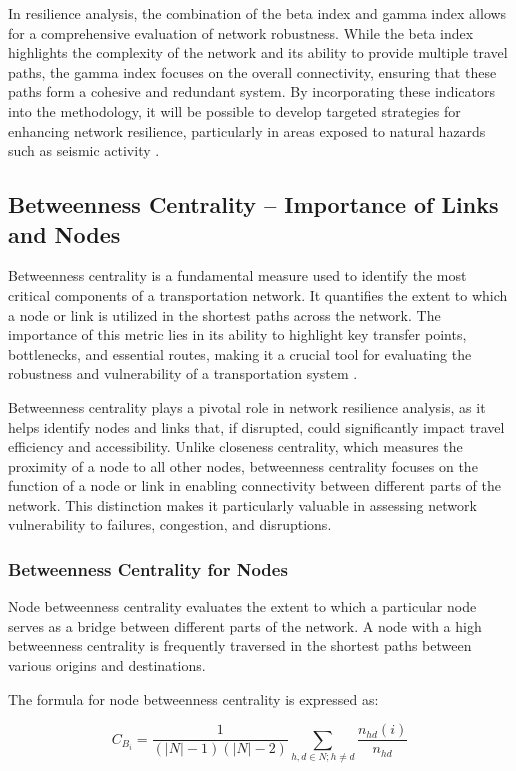 In resilience analysis, the combination of the beta index and gamma index allows for a comprehensive evaluation of network robustness. While the beta index highlights the complexity of the network and its ability to provide multiple travel paths, the gamma index focuses on the overall connectivity, ensuring that these paths form a cohesive and redundant system. By incorporating these indicators into the methodology, it will be possible to develop targeted strategies for enhancing network resilience, particularly in areas exposed to natural hazards such as seismic activity \cite{derrible2010, taylor2017}.

\subsection{Betweenness Centrality – Importance of Links and Nodes}
Betweenness centrality is a fundamental measure used to identify the most critical components of a transportation network. It quantifies the extent to which a node or link is utilized in the shortest paths across the network. The importance of this metric lies in its ability to highlight key transfer points, bottlenecks, and essential routes, making it a crucial tool for evaluating the robustness and vulnerability of a transportation system \cite{taylor2017}.

Betweenness centrality plays a pivotal role in network resilience analysis, as it helps identify nodes and links that, if disrupted, could significantly impact travel efficiency and accessibility. Unlike closeness centrality, which measures the proximity of a node to all other nodes, betweenness centrality focuses on the function of a node or link in enabling connectivity between different parts of the network. This distinction makes it particularly valuable in assessing network vulnerability to failures, congestion, and disruptions.
\subsubsection{Betweenness Centrality for Nodes}
Node betweenness centrality evaluates the extent to which a particular node serves as a bridge between different parts of the network. A node with a high betweenness centrality is frequently traversed in the shortest paths between various origins and destinations.

The formula for node betweenness centrality is expressed as:

\begin{equation}
C_{B_i} = \frac{1}{(|N| - 1) (|N| - 2)} \sum_{h,d \in N; h \neq d} \frac{n_{hd}(i)}{n_{hd}}
\end{equation}

